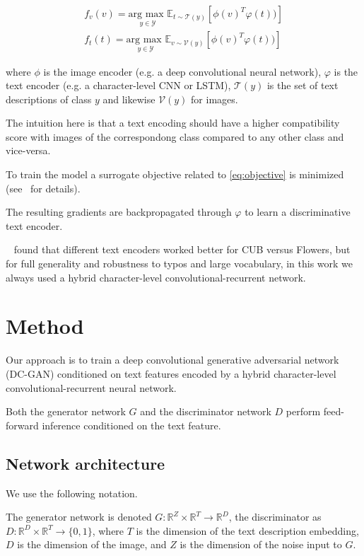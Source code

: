 \begin{align}
\label{eq:classifiers}
f_v(v) = \underset{y \in \mathcal{Y}}{\text{arg max }} \mathbb{E}_{t \sim \mathcal{T}(y)}[\phi(v)^T\varphi(t))]\\
f_t(t) = \underset{y \in \mathcal{Y}}{\text{arg max }} \mathbb{E}_{v \sim \mathcal{V}(y)}[\phi(v)^T\varphi(t))]
\end{align}

where $\phi$ is the image encoder (e.g. a deep convolutional neural network), $\varphi$ is the text encoder (e.g. a character-level CNN or LSTM), $\mathcal{T}(y)$ is the set of text descriptions of class $y$ and likewise $\mathcal{V}(y)$ for images.

The intuition here is that a text encoding should have a higher compatibility score with images of the correspondong class compared to any other class and vice-versa. 

To train the model a surrogate objective related to \autoref{eq:objective} is minimized (see~\citet{ARWLS15} for details).

The resulting gradients are backpropagated through $\varphi$ to learn a discriminative text encoder. 

~\citet{reed2015learning} found that different text encoders worked better for CUB versus Flowers, but for full generality and robustness to typos and large vocabulary, in this work we always used a hybrid character-level convolutional-recurrent network.

\section{Method}
\label{method}

Our approach is to train a deep convolutional generative adversarial network (DC-GAN) conditioned on text features encoded by a hybrid character-level convolutional-recurrent neural network.

Both the generator network $G$ and the discriminator network $D$ perform feed-forward inference conditioned on the text feature.

\subsection{Network architecture}
\label{subsec:architecture}

We use the following notation.

The generator network is denoted $G : \mathbb{R}^{Z} \times \mathbb{R}^{T} \rightarrow \mathbb{R}^{D}$, the discriminator as $D : \mathbb{R}^{D} \times \mathbb{R}^{T} \rightarrow \{0,1\}$, where $T$ is the dimension of the text description embedding, $D$ is the dimension of the image, and $Z$ is the dimension of the noise input to $G$.

